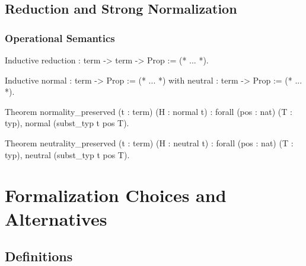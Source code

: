 \documentclass{beamer}
\begin{document}
\subsection{Reduction and Strong Normalization}

\begin{frame}[fragile]

\frametitle{Operational Semantics}

\begin{pyglist}
Inductive reduction : term -> term -> Prop := (* ... *).
\end{pyglist}

\begin{pyglist}
Inductive normal : term -> Prop := (* ... *)
  with neutral : term -> Prop := (* ... *).
\end{pyglist}

\begin{pyglist}
Theorem normality_preserved (t : term) (H : normal t) :
  forall (pos : nat) (T : typ), normal (subst_typ t pos T).
\end{pyglist}

\begin{pyglist}
Theorem neutrality_preserved (t : term) (H : neutral t) :
  forall (pos : nat) (T : typ), neutral (subst_typ t pos T).
\end{pyglist}


\end{frame}

\section{Formalization Choices and Alternatives}

\subsection{Definitions}
\end{document}
